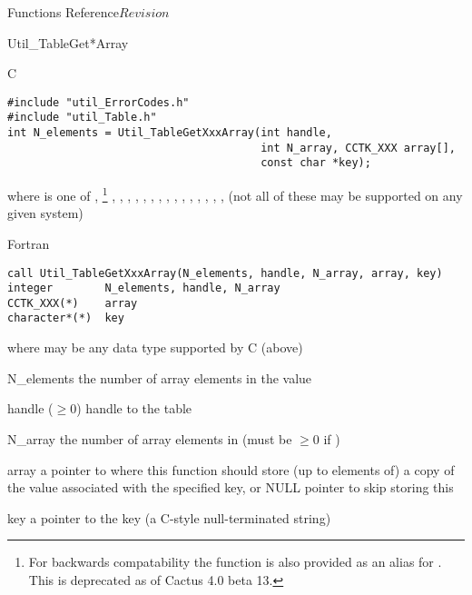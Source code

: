 \begin{cactuspart}{ Functions Reference}{}{$Revision$}
\begin{FunctionDescription}{Util\_TableGet*Array}
\begin{SynopsisSection}
\begin{Synopsis}{C}
\begin{verbatim}
#include "util_ErrorCodes.h"
#include "util_Table.h"
int N_elements = Util_TableGetXxxArray(int handle,
                                       int N_array, CCTK_XXX array[],
                                       const char *key);
\end{verbatim}
where  is one of
   , %
\footnote{%
	 For backwards compatability the function
	  is also provided
	 as an alias for .
	 This is deprecated as of Cactus 4.0 beta 13.
	 }%
,
   , ,
   , , , , ,
   , , , ,
   , , , 
(not all of these may be supported on any given system)
\end{Synopsis}
\begin{Synopsis}{Fortran}
\begin{verbatim}
call Util_TableGetXxxArray(N_elements, handle, N_array, array, key)
integer        N_elements, handle, N_array
CCTK_XXX(*)    array
character*(*)  key
\end{verbatim}
where  may be any data type supported by C (above)
\end{Synopsis}
\end{SynopsisSection}

\begin{ResultSection}
\begin{Result}{N\_elements}
the number of array elements in the value
\end{Result}
\end{ResultSection}

\begin{ParameterSection}
\begin{Parameter}{handle ($\ge 0$)}
handle to the table
\end{Parameter}
\begin{Parameter}{N\_array}
the number of array elements in 
(must be $\ge 0$ if )
\end{Parameter}
\begin{Parameter}{array}
a pointer to where this function should store (up to 
elements of) a copy of the value associated with the specified key,
or NULL pointer to skip storing this
\end{Parameter}
\begin{Parameter}{key}
a pointer to the key (a C-style null-terminated string)
\end{Parameter}
\end{ParameterSection}


\end{FunctionDescription}
\end{cactuspart}
